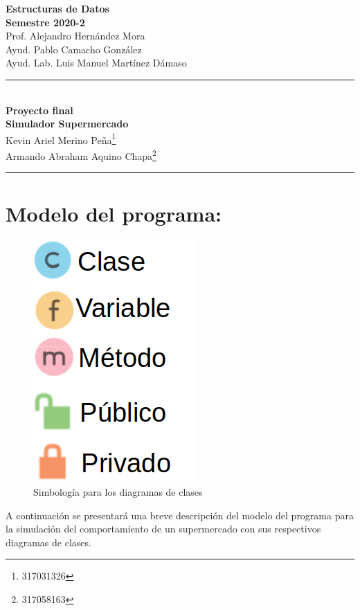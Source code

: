 \documentclass[letterpaper,11pt]{article}
\begin{document}
\begin{center}
\vspace{-114pt}
\textbf{\large Estructuras de Datos}\\
\textbf{ Semestre 2020-2}\\
Prof. Alejandro Hernández Mora\\
Ayud. Pablo Camacho González  \\ 
Ayud. Lab. Luis Manuel Martínez Dámaso   \\
\rule{17cm}{0.3mm}\\
\textbf{Proyecto final}\\
\huge\textbf{Simulador Supermercado}\\[0.1cm]
\normalsize Kevin Ariel Merino Peña\footnote{317031326}\\
Armando Abraham Aquino Chapa\footnote{317058163}\\
\rule{17cm}{0.3mm}
\end{center}
\section*{Modelo del programa:}
\begin{figure}[htb]
	\centering
	\includegraphics[scale=.23]{Simbologia.png}
	\caption{ Simbología para los diagramas de clases}
\end{figure}
A continuación se presentará una breve descripción del modelo del programa para la simulación del comportamiento de un supermercado con sus respectivos diagramas de clases.\\
\end{document}
